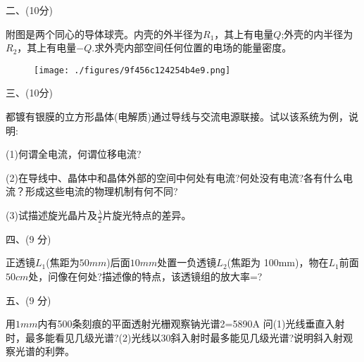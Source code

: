 二、(10分)

附图是两个同心的导体球壳。内壳的外半径为$R_1$，其上有电量$Q$;外壳的内半径为$R_2$，其上有电量$-Q$.求外壳内部空间任何位置的电场的能量密度。
\begin{figure}[ht]
\centering
\texttt{[image: ./figures/9f456c124254b4e9.png]}
\caption{} \label{fig_PKU199_4}
\end{figure}

三、(10分)

都镀有银膜的立方形晶体(电解质)通过导线与交流电源联接。试以该系统为例，说明:

(1)何谓全电流，何谓位移电流?

(2)在导线中、晶体中和晶体外部的空间中何处有电流?何处没有电流?各有什么电流？形成这些电流的物理机制有何不同?

(3)试描述旋光晶片及$\frac{\lambda}{2}$片旋光特点的差异。

四、(9 分)

正透镜$L_1$(焦距为$50mm$)后面$10mm$处置一负透镜$L_2$(焦距为 100mm)，物在$L_1$前面$50cm$处，问像在何处?描述像的特点，该透镜组的放大率=?

五、(9 分)

用$1mm$内有500条刻痕的平面透射光栅观察钠光谱2=5890A 问(1)光线垂直入射时，最多能看见几级光谱?(2)光线以30斜入射时最多能见几级光谱?说明斜入射观察光谱的利弊。